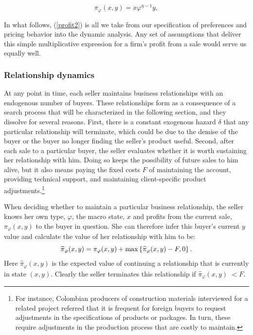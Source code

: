 \begin{equation}
\pi _{\varphi }(x,y)=x\varphi ^{\eta -1}y,  \label{profit2}
\end{equation}
\qquad \qquad

In what follows, (\ref{profit2}) is all we take from our specification of
preferences and pricing behavior into the dynamic analysis. Any set of
assumptions that deliver this simple multiplicative expression for a firm's
profit from a sale would serve us equally well.

\subsubsection{Relationship dynamics}

At any point in time, each seller maintains business relationships with an
endogenous number of buyers. These relationships form as a consequence of a
search process that will be characterized in the following section, and they
dissolve for several reasons. First, there is a constant exogenous hazard $%
\delta $ that any particular relationship will terminate, which could be due
to the demise of the buyer or the buyer no longer finding the seller's
product useful. Second, after each sale to a particular buyer, the seller
evaluates whether it is worth sustaining her relationship with him. Doing so
keeps the possibility of future sales to him alive, but it also means paying
the fixed costs $F$ of maintaining the account, providing technical support,
and maintaining client-specific product adjustments.\footnote{%
For instance, Colombian producers of construction materials interviewed for
a related project\citep{dominguez2010search} referred that it is frequent
for foreign buyers to request adjustments in the specifications of products
or packages. In turn, these require adjustments in the production process
that are costly to maintain.}

When deciding whether to maintain a particular business relationship, the
seller knows her own type, $\varphi $, the macro state, $x$ and profits from
the current sale, $\pi _{\varphi }(x,y)$ to the buyer in question. She can
therefore infer this buyer's current $y$ value and calculate the value of
her relationship with him to be:%
\begin{equation*}
\widetilde{\pi }_{\varphi }(x,y)=\pi _{\varphi }(x,y)+\max \left\{ \widehat{%
\pi }_{\varphi }(x,y)-F,0\right\} .
\end{equation*}%
Here $\widehat{\pi }_{\varphi }(x,y)$ is the expected value of continuing a
relationship that is currently in state $(x,y).$ Clearly the seller
terminates this relationship if $\widehat{\pi }_{\varphi }(x,y)$ $<F.$

